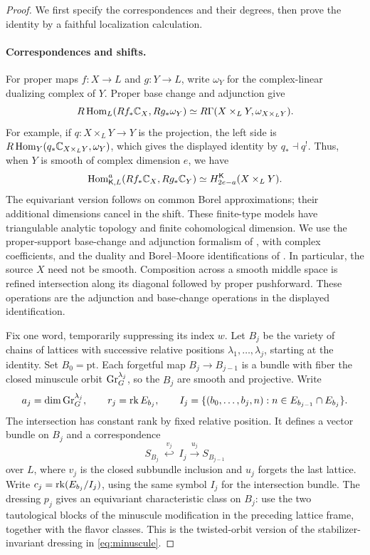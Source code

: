 \begin{proof}
We first specify the correspondences and their degrees, then prove the
identity by a faithful localization calculation.

\paragraph{Correspondences and shifts.}
For proper maps $f:X\to L$ and $g:Y\to L$, write $\omega_Y$ for the
complex-linear dualizing complex of $Y$.  Proper base change and adjunction
give
\[
 R\operatorname{Hom}_L(Rf_*\mathbb C_X,Rg_*\omega_Y)
 \simeq R\Gamma(X\times_LY,\omega_{X\times_LY}).
\]
For example, if $q:X\times_LY\to Y$ is the projection, the left side is
$R\operatorname{Hom}_Y(q_*\mathbb C_{X\times_LY},\omega_Y)$, which gives the displayed
identity by $q_*\dashv q^!$.  Thus, when $Y$ is smooth of complex dimension
$e$, we have
\begin{equation}
 \label{eq:finite-correspondence-Hom}
 \operatorname{Hom}^a_{\mathsf K,L}(Rf_*\mathbb C_X,Rg_*\mathbb C_Y)
 \simeq H^{\mathsf K}_{2e-a}(X\times_LY).
\end{equation}
The equivariant version follows on common Borel approximations; their
additional dimensions cancel in the shift.  These finite-type models have
triangulable analytic topology and finite cohomological dimension.
We use the proper-support base-change and adjunction formalism of
\cite[Theorems~5.10 and 7.7]{SchnurerSoergel16}, with complex coefficients,
and the duality and Borel--Moore identifications of
\cite[Example~2.7(3) and Corollary~2.11]{MaximSchurmann21}.
In particular, the source
$X$ need not be smooth.  Composition across a smooth middle space is
refined intersection along its diagonal followed by proper pushforward.
These operations are the adjunction and base-change operations in the
displayed identification.

Fix one word, temporarily suppressing its index $w$.  Let $B_j$ be the
variety of chains of lattices with successive relative positions
$\lambda_1,\ldots,\lambda_j$, starting at the identity.  Set
$B_0=\mathrm{pt}$.  Each forgetful map $B_j\to B_{j-1}$ is a bundle with
fiber the closed minuscule orbit $\operatorname{Gr}_G^{\lambda_j}$, so the $B_j$ are
smooth and projective.  Write
\[
 a_j=\dim\operatorname{Gr}_G^{\lambda_j},\qquad
 r_j=\operatorname{rk} E_{b_j},\qquad
 I_j=\{(b_0,\ldots,b_j,n):n\in E_{b_{j-1}}\cap E_{b_j}\}.
\]
The intersection has constant rank by fixed relative position.  It defines
a vector bundle on $B_j$ and a correspondence
\[
 S_{B_j}\ \overset{v_j}{\hookleftarrow}\ I_j
       \xrightarrow{u_j} S_{B_{j-1}}
\]
over $L$, where $v_j$ is the closed subbundle inclusion and $u_j$ forgets
the last lattice.  Write
$c_j=\operatorname{rk}(E_{b_j}/I_j)$, using the same symbol $I_j$ for the intersection
bundle.  The dressing $p_j$ gives an equivariant characteristic class on
$B_j$: use the two tautological blocks of the minuscule modification in
the preceding lattice frame, together with the flavor classes.  This is
the twisted-orbit version of the stabilizer-invariant dressing in
\eqref{eq:minuscule}.


\end{proof}

